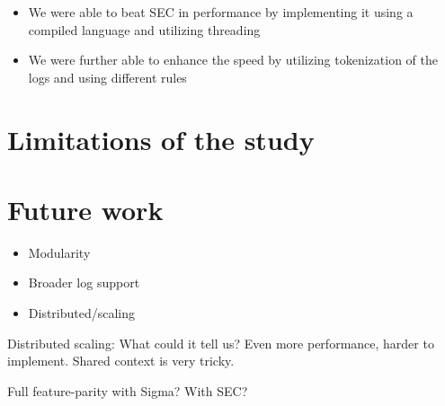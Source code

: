\iffalse
high signal low noise
1000 = 40.17%
10 000 = 34.19%
100 000 = 22.78%
1 000 000 = 20.5%

baseline
1000 = 89.5%
10 000 = 135.7%
100 000 = 127%
1 000 000 = 101.1%
\fi

\begin{itemize}
    \item We were able to beat SEC in performance by implementing it using a compiled language and utilizing threading
    \item We were further able to enhance the speed by utilizing tokenization of the logs and using different rules
\end{itemize}




\section{Limitations of the study}
\label{sec:limitations}

\section{Future work}
\label{sec:futurework}

\begin{itemize}
    \item Modularity
    \item Broader log support
    \item Distributed/scaling
\end{itemize}

Distributed scaling: What could it tell us? Even more performance, harder to implement. Shared context is very tricky.

Full feature-parity with Sigma? With SEC?